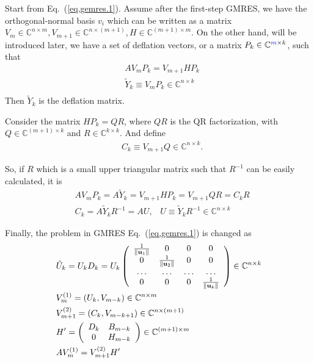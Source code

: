Start from Eq.~(\ref{eq,gemres.1}). Assume after the first-step GMRES, we have the orthogonal-normal basis $v_i$ which can be written as a matrix $V_m\in \mathbb{C}^{n\times m},V_{m+1}\in \mathbb{C}^{n\times (m+1)},H\in \mathbb{C}^{(m+1)\times m}$. On the other hand, will be introduced later, we have a set of deflation vectors, or a matrix $P_k\in \mathbb{C}^{\textcolor[rgb]{0,0,1}{m}\times k}$, such that
\begin{equation}
\begin{split}
&AV_mP_k=V_{m+1}HP_k\\
&\tilde {Y}_k\equiv V_mP_k \in \mathbb{C}^{n\times k}\\
\end{split}
\end{equation}
Then $\tilde {Y}_k$ is the deflation matrix.

Consider the matrix $HP_k=QR$, where $QR$ is the QR factorization, with $Q\in \mathbb{C}^{(m+1)\times k}$ and $R\in \mathbb{C}^{k\times k}$. And define
\begin{equation}
\begin{split}
&C_k\equiv V_{m+1}Q\in \mathbb{C}^{n\times k}.
\end{split}
\end{equation}

So, if $R$ which is a small upper triangular matrix such that $R^{-1}$ can be easily calculated, it is
\begin{equation}
\begin{split}
&AV_mP_k=A\tilde{Y}_k=V_{m+1}HP_k=V_{m+1}QR=C_kR\\
&C_k=A\tilde{Y}_kR^{-1}=A U,\;\;\;U\equiv \tilde{Y}_kR^{-1} \in \mathbb{C}^{n\times k}
\end{split}
\end{equation}

Finally, the problem in GMRES Eq.~(\ref{eq,gemres.1}) is changed as
\begin{equation}
\begin{split}
&\tilde{U}_k=U_kD_k=U_k\left(\begin{array}{cccc}
\frac{1}{\|{\bf u}_1\|} & 0 & 0 & 0 \\
0 & \frac{1}{\|{\bf u}_2\|} & 0 & 0 \\
\ldots & \ldots & \ldots & \ldots \\
0 & 0 & 0 & \frac{1}{\|{\bf u}_k\|} \\
\end{array}\right) \in \mathbb{C}^{n\times k}\\
&V^{(1)}_m=(U_k, V_{m-k})\in \mathbb{C}^{n\times m}\\
&V^{(2)}_{m+1}=(C_k, V_{m-k+1})\in \mathbb{C}^{n\times (m+1)}\\
&H'=\left(\begin{array}{cc}
D_k & B_{m-k} \\
0 & H_{m-k}
\end{array}\right) \in \mathbb{C}^{(m+1)\times m}\\
&AV^{(1)}_m=V^{(2)}_{m+1}H'\\
\end{split}
\label{eq.gcrodr.1}
\end{equation}

